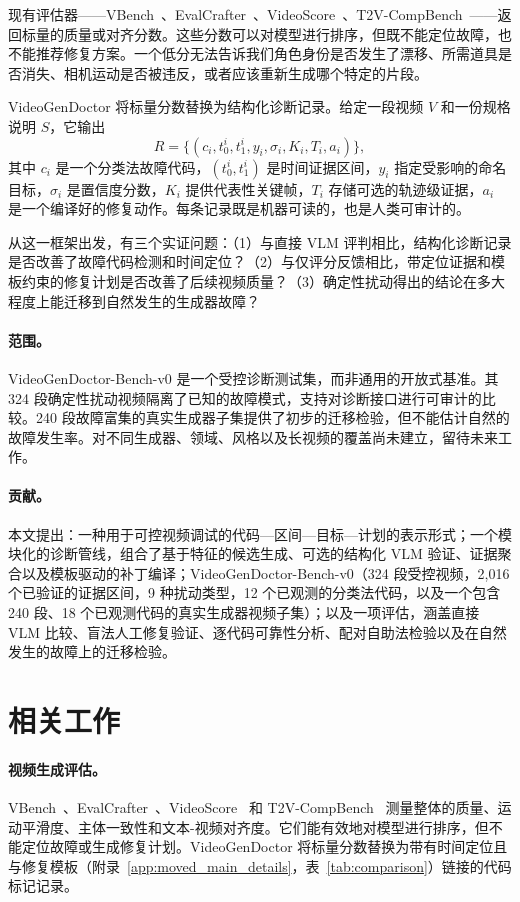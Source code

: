 \documentclass{article}
\begin{document}
现有评估器——VBench~\cite{vbench2024}、EvalCrafter~\cite{evalcrafter2024}、VideoScore~\cite{videoscore2024}、T2V-CompBench~\cite{t2vcompbench2024}——返回标量的质量或对齐分数。这些分数可以对模型进行排序，但既不能定位故障，也不能推荐修复方案。一个低分无法告诉我们角色身份是否发生了漂移、所需道具是否消失、相机运动是否被违反，或者应该重新生成哪个特定的片段。

VideoGenDoctor 将标量分数替换为结构化诊断记录。给定一段视频 $V$ 和一份规格说明 $S$，它输出
\[
R = \{(c_i,t_0^i,t_1^i,y_i,\sigma_i,K_i,T_i,a_i)\},
\]
其中 $c_i$ 是一个分类法故障代码，$(t_0^i,t_1^i)$ 是时间证据区间，$y_i$ 指定受影响的命名目标，$\sigma_i$ 是置信度分数，$K_i$ 提供代表性关键帧，$T_i$ 存储可选的轨迹级证据，$a_i$ 是一个编译好的修复动作。每条记录既是机器可读的，也是人类可审计的。

从这一框架出发，有三个实证问题：（1）与直接 VLM 评判相比，结构化诊断记录是否改善了故障代码检测和时间定位？（2）与仅评分反馈相比，带定位证据和模板约束的修复计划是否改善了后续视频质量？（3）确定性扰动得出的结论在多大程度上能迁移到自然发生的生成器故障？

\paragraph{范围。}
VideoGenDoctor-Bench-v0 是一个受控诊断测试集，而非通用的开放式基准。其 324 段确定性扰动视频隔离了已知的故障模式，支持对诊断接口进行可审计的比较。240 段故障富集的真实生成器子集提供了初步的迁移检验，但不能估计自然的故障发生率。对不同生成器、领域、风格以及长视频的覆盖尚未建立，留待未来工作。

\paragraph{贡献。}
本文提出：一种用于可控视频调试的代码—区间—目标—计划的表示形式；一个模块化的诊断管线，组合了基于特征的候选生成、可选的结构化 VLM 验证、证据聚合以及模板驱动的补丁编译；VideoGenDoctor-Bench-v0（324 段受控视频，2,016 个已验证的证据区间，9 种扰动类型，12 个已观测的分类法代码，以及一个包含 240 段、18 个已观测代码的真实生成器视频子集）；以及一项评估，涵盖直接 VLM 比较、盲法人工修复验证、逐代码可靠性分析、配对自助法检验以及在自然发生的故障上的迁移检验。

\section{相关工作}
\label{sec:related}

\paragraph{视频生成评估。}
VBench~\cite{vbench2024}、EvalCrafter~\cite{evalcrafter2024}、VideoScore~\cite{videoscore2024} 和 T2V-CompBench~\cite{t2vcompbench2024} 测量整体的质量、运动平滑度、主体一致性和文本-视频对齐度。它们能有效地对模型进行排序，但不能定位故障或生成修复计划。VideoGenDoctor 将标量分数替换为带有时间定位且与修复模板（附录~\ref{app:moved_main_details}，表~\ref{tab:comparison}）链接的代码标记记录。
\end{document}
